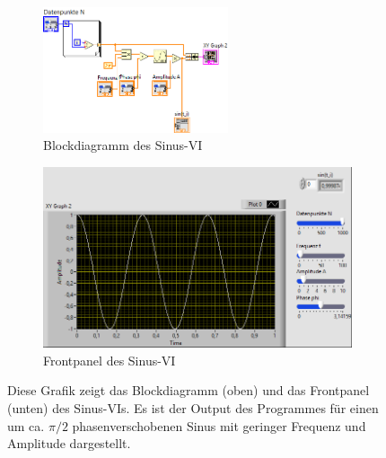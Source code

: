 \begin{figure}[H]
	\centering
	\begin{subfigure}[c]{\textwidth}
		\centering
		\includegraphics[width=0.6\textwidth]{pic/sinBlock.png}
		\caption{Blockdiagramm des Sinus-VI}
		\label{fig:sinusB}
	\end{subfigure}
	\begin{subfigure}[c]{\textwidth}
		\centering
		\includegraphics[width=\textwidth]{pic/sinFront.png}
		\caption{Frontpanel des Sinus-VI}
		\label{fig:sinusF}
	\end{subfigure}
	\caption{Diese Grafik zeigt das Blockdiagramm (oben) und das Frontpanel (unten) des Sinus-VIs. Es ist der Output des Programmes für einen um ca. $\pi / 2$ phasenverschobenen Sinus mit geringer Frequenz und Amplitude dargestellt.}
	\label{fig:sinus}	
\end{figure}

\

